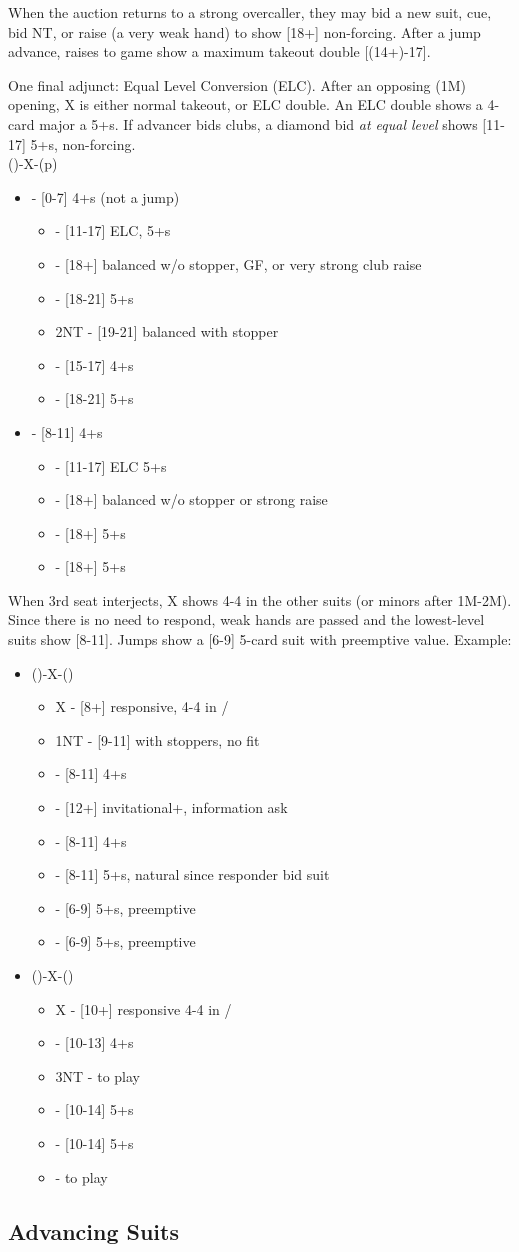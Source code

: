 \documentclass[12pt]{report}
\newcommand{\n}{\\}
\newcommand{\q}[1]{\multido{}{#1}{\qquad}}
\newcommand{\ul}[1]{\begin{itemize}#1\end{itemize}}
\newcommand{\li}[1]{\item[~] \q{#1}}
\begin{document}
    When the auction returns to a strong overcaller, they may bid a new suit, cue, bid NT, or raise (a very weak hand) to show [18+] non-forcing.  After a jump advance, raises to game show a maximum takeout double [(14+)-17].

    One final adjunct: Equal Level Conversion (ELC).  After an opposing (1M) opening, X is either normal takeout, or ELC double.  An ELC double shows a 4-card major a 5+\di{}s.  If advancer bids clubs, a diamond bid \textit{at equal level} shows [11-17] 5+\di{}s, non-forcing. \n

    ()-X-(p)
    \ul{
        \li0  - [0-7] 4+\cl{}s (not a jump) \ul{
            \li0 \di2 - [11-17] ELC, 5+\di{}s
            \li0 \he2 - [18+] balanced w/o stopper, GF, or very strong club raise
            \li0 \sp2 - [18-21] 5+\sp{}s
            \li0 2NT - [19-21] balanced with stopper
            \li0 \cl3 - [15-17] 4+\cl{}s
            \li0 \di3 - [18-21] 5+\di{}s
        }

        \li0 \cl3 - [8-11] 4+\cl{}s \ul{
            \li0 \di3 - [11-17] ELC 5+\di{}s
            \li0 \he3 - [18+] balanced w/o stopper or strong raise
            \li0 \sp3 - [18+] 5+\sp{}s
            \li0 \di4 - [18+] 5+\di{}s
        }
    }

    When 3rd seat interjects, X shows 4-4 in the other suits (or minors after 1M-2M). Since there is no need to respond, weak hands are passed and the lowest-level suits show [8-11].  Jumps show a [6-9] 5-card suit with preemptive value.  Example:

    \ul{
        \li0 ()-X-() \ul{
            \li0 X - [8+] responsive, 4-4 in \cl{}/\sp{}
            \li0 1NT - [9-11] with stoppers, no fit
            \li0 \cl2 - [8-11] 4+\cl{}s
            \li0 \di2 - [12+] invitational+, information ask
            \li0 \he2 - [8-11] 4+\he{}s
            \li0 \sp2 - [8-11] 5+\sp{}s, natural since responder bid suit
            \li0 \cl3 - [6-9] 5+\cl{}s, preemptive
            \li0 \he3 - [6-9] 5+\he{}s, preemptive
        }

        \li0 (\he1)-X-(\he3) \ul{
            \li0 X - [10+] responsive 4-4 in \cl{}/\di{}
            \li0 \sp3 - [10-13] 4+\sp{}s
            \li0 3NT - to play
            \li0 \cl4 - [10-14] 5+\cl{}s
            \li0 \di4 - [10-14] 5+\di{}s
            \li0 \sp4 - to play
        }
    }

\subsection{Advancing Suits}
\end{document}
